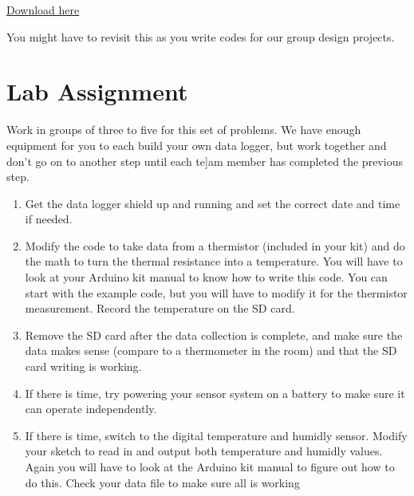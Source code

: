 \begin{center}
\href{https://raw.githubusercontent.com/rtlines/IntermediateLabPH250/main/Code/DataLogBME680_lines.ino}{Download here}
\end{center}

\noindent You might have to revisit this as you write codes for our group design projects.


\section{Lab Assignment}
	
	Work in groups of three to five for this set of problems. We have enough equipment for you to each build your own data logger, but work together and don't go on to another step until each te]am member has completed the previous step.
	
	\begin{enumerate}
		\item Get the data logger shield up and running and set the correct date and time if needed.
		
		\item Modify the code to take data from a thermistor (included in your kit) and do the math to turn the thermal resistance into a temperature. You will have to look at your Arduino kit manual to know how to write this code. You can start with the example code, but you will have to modify it for the thermistor measurement. Record the temperature on the SD card.
		
		\item Remove the SD card after the data collection is complete, and make sure the data makes sense (compare to a thermometer in the room) and that the SD card writing is working.
		
		\item If there is time, try powering your sensor system on a battery to make sure it can operate independently.
		
		\item If there is time, switch to the digital temperature and humidly sensor. Modify your sketch to read in and output both temperature and humidly values. Again you will have to look at the Arduino kit manual to figure out how to do this. Check your data file to make sure all is working
	\end{enumerate}



